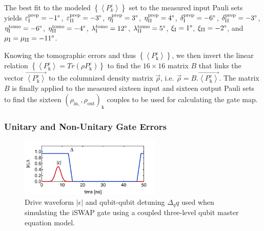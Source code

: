 The best fit to the modeled $\left\{ \left\langle P_{k}^{e}\right\rangle \right\} $
set to the measured input Pauli sets yields $\varepsilon_{\mathrm{I}}^{\mathrm{prep}}=-1\text{\textdegree}$,
$\varepsilon_{\mathrm{II}}^{\mathrm{prep}}=-3\text{\textdegree}$,
$\eta_{\mathrm{I}}^{\mathrm{prep}}=3\text{\textdegree}$, $\mathrm{\eta}_{\mathrm{II}}^{\mathrm{prep}}=4\text{\textdegree}$,
$\delta_{\mathrm{I}}^{\mathrm{prep}}=-6\text{\textdegree}$, $\delta_{\mathrm{II}}^{\mathrm{prep}}=-3\text{\textdegree}$,
$\eta_{\mathrm{I}}^{\mathrm{tomo}}=-6\text{\textdegree}$, $\eta_{\mathrm{II}}^{\mathrm{tomo}}=-4\text{\textdegree}$,
$\lambda_{\mathrm{I}}^{t\mathrm{omo}}=12\text{\textdegree}$, $\lambda_{\mathrm{II}}^{\mathrm{tomo}}=5\text{\textdegree}$,
$\xi_{\mathrm{I}}=1\text{\textdegree}$, $\xi_{\mathrm{II}}=-2\text{\textdegree}$,
and $\mu_{\mathrm{I}}=\mu_{\mathrm{II}}=-11\text{\textdegree}$.

Knowing the tomographic errors and thus $\left\{ \left\langle P_{\mathrm{k}}^{\mathrm{e}}\right\rangle \right\} $,
we then invert the linear relation $\left\{ \left\langle P_{\mathrm{k}}^{\mathrm{e}}\right\rangle =Tr\left(\rho P_{\mathrm{k}}^{\mathrm{e}}\right)\right\} $
to find the $16\times16$ matrix $B$ that links the vector $\overrightarrow{\left\langle P_{\mathrm{k}}^{\mathrm{e}}\right\rangle }$
to the columnized density matrix $\overrightarrow{\rho}$, i.e. $\overrightarrow{\rho}=B.\overrightarrow{\left\langle P_{\mathrm{k}}^{\mathrm{e}}\right\rangle }$.
The matrix $B$ is finally applied to the measured sixteen input and
sixteen output Pauli sets to find the sixteen $(\rho_{\mathrm{in},},\rho_{\mathrm{out}})_{\mathrm{k}}$
couples to be used for calculating the gate map.

\subsubsection{Unitary and Non-Unitary Gate Errors}

\begin{figure}
	\centering
	\includegraphics[width=0.6\textwidth]{./data/simulation/three_level_swap/waveforms}
	\caption{Drive waveform $|\epsilon|$ and qubit-qubit detuning $\Delta_qq$ used when simulating the iSWAP gate using a coupled three-level qubit master equation model.}
	\label{fig:swap_3_level_waveforms}
\end{figure}


